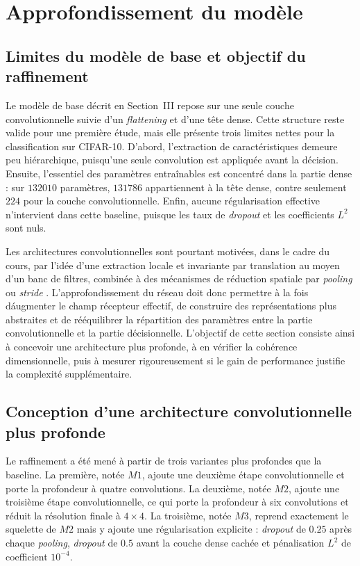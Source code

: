 ﻿\section{Approfondissement du mod\`ele}

\subsection{Limites du mod\`ele de base et objectif du raffinement}
Le mod\`ele de base d\'ecrit en Section~III repose sur une seule couche convolutionnelle suivie d'un \textit{flattening} et d'une t\^ete dense. Cette structure reste valide pour une premi\`ere \'etude, mais elle pr\'esente trois limites nettes pour la classification sur CIFAR-10. D'abord, l'extraction de caract\'eristiques demeure peu hi\'erarchique, puisqu'une seule convolution est appliqu\'ee avant la d\'ecision. Ensuite, l'essentiel des param\`etres entra\^inables est concentr\'e dans la partie dense : sur $132010$ param\`etres, $131786$ appartiennent \`a la t\^ete dense, contre seulement $224$ pour la couche convolutionnelle. Enfin, aucune r\'egularisation effective n'intervient dans cette baseline, puisque les taux de \textit{dropout} et les coefficients $L^2$ sont nuls.

Les architectures convolutionnelles sont pourtant motiv\'ees, dans le cadre du cours, par l'id\'ee d'une extraction locale et invariante par translation au moyen d'un banc de filtres, combin\'ee \`a des m\'ecanismes de r\'eduction spatiale par \textit{pooling} ou \textit{stride} \cite{manzanera_classification_apprentissage,poly_chap4_classifml,lecun_convolutional_networks}. L'approfondissement du r\'eseau doit donc permettre \`a la fois d\'augmenter le champ r\'ecepteur effectif, de construire des repr\'esentations plus abstraites et de r\'e\'equilibrer la r\'epartition des param\`etres entre la partie convolutionnelle et la partie d\'ecisionnelle. L'objectif de cette section consiste ainsi \`a concevoir une architecture plus profonde, \`a en v\'erifier la coh\'erence dimensionnelle, puis \`a mesurer rigoureusement si le gain de performance justifie la complexit\'e suppl\'ementaire.

\subsection{Conception d'une architecture convolutionnelle plus profonde}
Le raffinement a \'et\'e men\'e \`a partir de trois variantes plus profondes que la baseline. La premi\`ere, not\'ee $M1$, ajoute une deuxi\`eme \'etape convolutionnelle et porte la profondeur \`a quatre convolutions. La deuxi\`eme, not\'ee $M2$, ajoute une troisi\`eme \'etape convolutionnelle, ce qui porte la profondeur \`a six convolutions et r\'eduit la r\'esolution finale \`a $4\times 4$. La troisi\`eme, not\'ee $M3$, reprend exactement le squelette de $M2$ mais y ajoute une r\'egularisation explicite : \textit{dropout} de $0.25$ apr\`es chaque \textit{pooling}, \textit{dropout} de $0.5$ avant la couche dense cach\'ee et p\'enalisation $L^2$ de coefficient $10^{-4}$.


